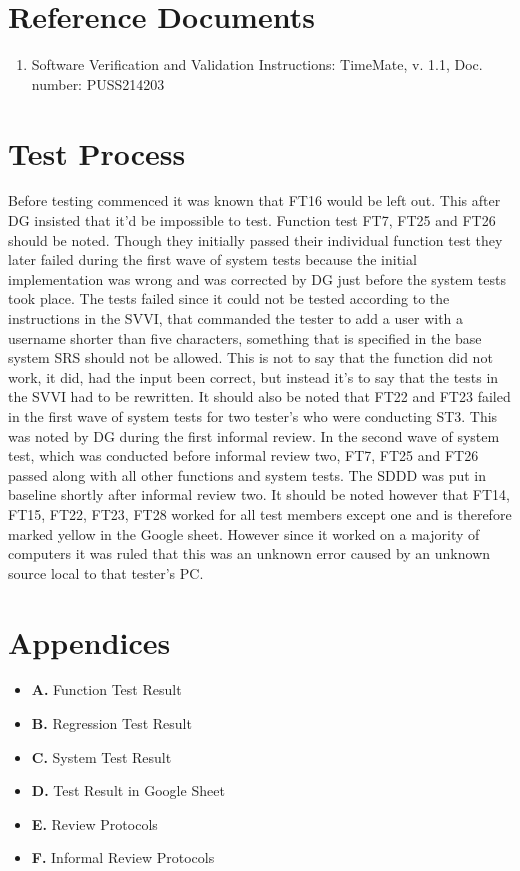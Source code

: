 \documentclass{article}
\begin{document}
\section{Reference Documents}
\begin{enumerate}
	\item Software Verification and Validation Instructions: 	TimeMate, v. 1.1, Doc. number: PUSS214203
\end{enumerate}

\section{Test Process}
Before testing commenced it was known that FT16 would be left out. This after DG insisted that it’d be impossible to test. \newline \newline Function test FT7, FT25 and FT26 should be noted. Though they initially passed their individual function test they later failed during the first wave of system tests because the initial implementation was wrong and was corrected by DG just before the system tests took place. The tests failed since it could not be tested according to the instructions in the SVVI, that commanded the tester to add a user with a username shorter than five characters, something that is specified in the base system SRS should not be allowed. This is not to say that the function did not work, it did, had the input been correct, but instead it’s to say that the tests in the SVVI had to be rewritten. It should also be noted that FT22 and FT23 failed in the first wave of system tests for two tester's who were conducting ST3. This was noted by DG during the first informal review. \newline \newline In the second wave of system test, which was conducted before informal review two, FT7, FT25 and FT26 passed along with all other functions and system tests. The SDDD was put in baseline shortly after informal review two. It should be noted however that FT14, FT15, FT22, FT23, FT28 worked for all test members except one and is therefore marked yellow in the Google sheet. However since it worked on a majority of computers it was ruled that this was an unknown error caused by an unknown source local to that tester's PC.


\section{Appendices}
\begin{itemize}
\item \textbf{A.} Function Test Result
\item \textbf{B.} Regression Test Result 
\item \textbf{C.} System Test Result
\item \textbf{D.} Test Result in Google Sheet
\item \textbf{E.} Review Protocols
\item \textbf{F.} Informal Review Protocols
\end{itemize}
\end{document}

